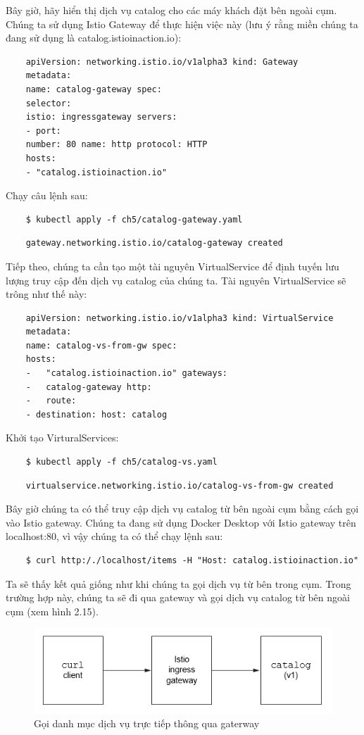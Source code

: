 \documentclass[12pt,a4paper]{report}
\begin{document}
Bây giờ, hãy hiển thị dịch vụ catalog cho các máy khách đặt bên ngoài cụm. Chúng ta sử dụng Istio Gateway để thực hiện việc này (lưu ý rằng miền chúng ta đang sử dụng là catalog.istioinaction.io):
\begin{verbatim}
	apiVersion: networking.istio.io/v1alpha3 kind: Gateway
	metadata:
	name: catalog-gateway spec:
	selector:
	istio: ingressgateway servers:
	- port:
	number: 80 name: http protocol: HTTP
	hosts:
	- "catalog.istioinaction.io"
\end{verbatim}

Chạy câu lệnh sau:
\begin{lstlisting}
	$ kubectl apply -f ch5/catalog-gateway.yaml
\end{lstlisting}
\begin{verbatim}
	gateway.networking.istio.io/catalog-gateway created
\end{verbatim}

Tiếp theo, chúng ta cần tạo một tài nguyên VirtualService để định tuyến lưu lượng truy cập đến dịch vụ catalog của chúng ta. Tài nguyên VirtualService sẽ trông như thế này:
\begin{verbatim}
	apiVersion: networking.istio.io/v1alpha3 kind: VirtualService
	metadata:
	name: catalog-vs-from-gw spec:
	hosts:
	-	"catalog.istioinaction.io" gateways:
	-	catalog-gateway http:
	-	route:
	- destination: host: catalog
\end{verbatim}

Khởi tạo VirturalServices:
\begin{lstlisting}
	$ kubectl apply -f ch5/catalog-vs.yaml 
\end{lstlisting}
\begin{verbatim}
	virtualservice.networking.istio.io/catalog-vs-from-gw created
\end{verbatim}

Bây giờ chúng ta có thể truy cập dịch vụ catalog từ bên ngoài cụm bằng cách gọi vào Istio gateway. Chúng ta đang sử dụng Docker Desktop với Istio gateway trên
localhost:80, vì vậy chúng ta có thể chạy lệnh sau:
\begin{lstlisting}
	$ curl http:/./localhost/items -H "Host: catalog.istioinaction.io"
\end{lstlisting}

Ta sẽ thấy kết quả giống như khi chúng ta gọi dịch vụ từ bên trong cụm. Trong trường hợp này, chúng ta sẽ đi qua gateway và gọi dịch vụ catalog từ bên ngoài cụm (xem hình 2.15).
\begin{figure}[h]
	\centering
	\includegraphics[width=0.7\linewidth]{Pics/2.2.2-p1}
	\caption{Gọi danh mục dịch vụ trực tiếp thông qua gaterway}
	\label{fig:2.2.2-1}
\end{figure}
\end{document}
